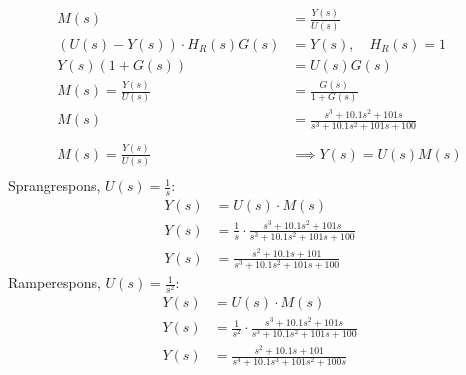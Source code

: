 \begin{align*}
	M(s)                           & = \frac{Y(s)}{U(s)}                                       \\
	(U(s) - Y(s)) \cdot H_R(s)G(s) & = Y(s), \quad H_R(s) = 1                                  \\
	Y(s)(1 + G(s))                 & = U(s)G(s)                                                \\
	M(s) = \frac{Y(s)}{U(s)}       & = \frac{G(s)}{1 + G(s)}                                   \\
	M(s)                           & = \frac{s^3 + 10.1s^2 + 101s}{s^3 + 10.1s^2 + 101s + 100} \\\\
	M(s) = \frac{Y(s)}{U(s)}       & \implies Y(s) = U(s)M(s)                                  \\
\end{align*}
Sprangrespons, $U(s) = \frac{1}{s}$:
\begin{align*}
	Y(s) & = U(s)\cdot M(s)                                                          \\
	Y(s) & = \frac{1}{s}\cdot\frac{s^3 + 10.1s^2 + 101s}{s^3 + 10.1s^2 + 101s + 100} \\
	Y(s) & = \frac{s^2 + 10.1s + 101}{s^3 + 10.1s^2 + 101s + 100}                    
\end{align*}
Ramperespons, $U(s) = \frac{1}{s^2}$:
\begin{align*}
	Y(s) & = U(s)\cdot M(s)                                                            \\
	Y(s) & = \frac{1}{s^2}\cdot\frac{s^3 + 10.1s^2 + 101s}{s^3 + 10.1s^2 + 101s + 100} \\
	Y(s) & = \frac{s^2 + 10.1s + 101}{s^4 + 10.1s^3 + 101s^2 + 100s}                   
\end{align*}